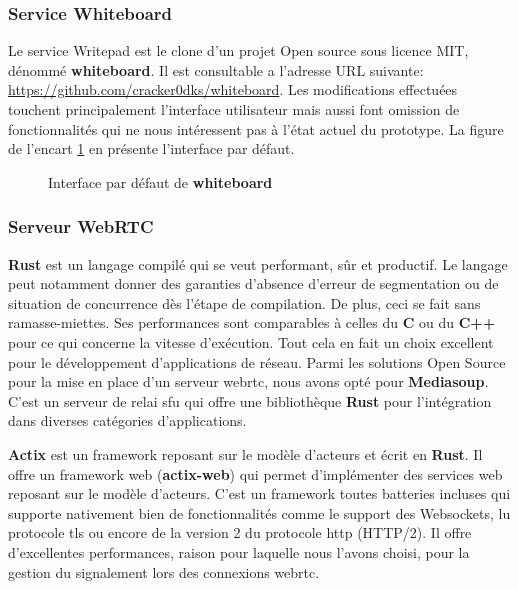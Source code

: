 \subsubsection{Service Whiteboard}
Le service Writepad est le clone d’un projet Open source sous licence MIT, dénommé \textbf{whiteboard}. 
Il est consultable a l’adresse URL suivante: \href{https://github.com/cracker0dks/whiteboard}{https://github.com/cracker0dks/whiteboard}. 
Les modifications effectuées touchent principalement l’interface utilisateur mais aussi font omission de fonctionnalités qui ne nous intéressent pas à l'état actuel du prototype. 
La figure de l’encart \ref{fig:whiteboard_demo} en présente l’interface par défaut.


\begin{figure}[H]
  \centering
  \caption{Interface par défaut de \textbf{whiteboard}}
  \label{fig:whiteboard_demo}
\end{figure}


\subsubsection{Serveur WebRTC}
\textbf{Rust} est un langage compilé qui se veut performant, sûr et productif\cite{rust}. 
Le langage peut notamment donner des garanties d'absence d'erreur de segmentation ou de situation de concurrence 
dès l'étape de compilation. De plus, ceci se fait sans ramasse-miettes. Ses performances sont comparables à celles du \textbf {C} ou du \textbf{C++} pour ce qui concerne la vitesse d'exécution. 
Tout cela en fait un choix excellent pour le développement d'applications de réseau. Parmi les solutions Open Source pour la mise en place d’un serveur \acrshort{webrtc}, 
nous avons opté pour \textbf{Mediasoup}. C’est un serveur de relai \acrshort{sfu} qui offre une bibliothèque \textbf{Rust} pour l'intégration dans diverses catégories d'applications. 

\textbf{Actix} est un framework reposant sur le modèle d’acteurs \cite{actor_design_pattern} et écrit en \textbf{Rust}. 
Il offre un framework web (\textbf{actix-web}) qui permet d’implémenter des services web reposant sur le modèle d’acteurs. 
C’est un framework toutes batteries incluses qui supporte nativement bien de fonctionnalités comme le support des Websockets, lu protocole \acrshort{tls} ou encore de la version 2 du protocole \acrshort{http} (HTTP/2). 
Il offre d’excellentes performances, raison pour laquelle nous l’avons choisi, pour la gestion du signalement lors des connexions \acrshort{webrtc}.

